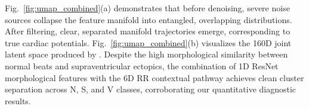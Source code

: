 Fig.~\ref{fig:umap_combined}(a) demonstrates that before denoising, severe noise sources collapse the feature manifold into entangled, overlapping distributions. After \HSL{} filtering, clear, separated manifold trajectories emerge, corresponding to true cardiac potentials. Fig.~\ref{fig:umap_combined}(b) visualizes the 160D joint latent space produced by \RRN. Despite the high morphological similarity between normal beats and supraventricular ectopics, the combination of 1D ResNet morphological features with the 6D RR contextual pathway achieves clean cluster separation across N, S, and V classes, corroborating our quantitative diagnostic results.
